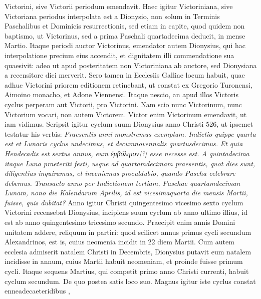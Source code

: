 Victorini, sive Victorii periodum emendavit.
Haec igitur Victoriniana,
sive Victoriana periodus interpolata est a Dionysio, non solum
in Terminis Paschalibus et Dominicis resurrectionis, sed etiam
in capite, quod quidem non baptismo, ut Victorinus, sed a prima
Paschali quartadecima deducit, in mense Martio.
Itaque periodi
auctor Victorinus, emendator autem Dionysius, qui hac interpolatione
precium eius accendit, et dignitatem illi commendatione
sua quaesivit: adeo ut apud posteritatem non Victoriniana ab auctore,
sed Dionysiana a recensitore dici merverit.
Sero tamen in Ecclesiis
Galliae locum habuit, quae adhuc Victorini priorem editionem
retinebant, ut constat ex Gregorio Turonensi, Aimoino monacho,
et Adone Viennensi.
Itaque nescio, an apud illos Victoris
cyclus perperam aut Victorii, pro Victorini.
Nam scio nunc Victorinum,
nunc Victorium vocari, non autem Victorem.
Victor
enim Victorinum emendavit, ut iam vidimus.
Scripsit igitur cyclum
suum Dionysius anno Christi 526, ut ipsemet testatur his verbis:
\textit{Praesentis anni monstremus exemplum.}
\textit{Indictio quippe quarta est
et Lunaris cyclus undecimus, et decumnovennalis quartusdecimus.}
\textit{Et quia Hendecadis est sextus annus,
 eum \textgreek{ἐμβόλιμον[?]} esse necesse est.}
\textit{A quintadecima itaque Luna praeteriti festi,
 usque ad quartamdecimam
praesentis, quot dies sunt, diligentius inquiramus, et inveniemus proculdubio,
quando Pascha celebrare debemus.}
\textit{Transacto anno per Indictionem
tertiam, Paschae quartamdeciman Lunam, nono die Kalendarum
Aprilis, id est vicesimaquarta die mensis Martii, fuisse,
quis dubitat?}
Anno igitur Christi quingentesimo vicesimo sexto
cyclum Victorini recensebat Dionysius, incipiens suum cyclum ab
anno ultimo illius, id est ab anno quingentesimo tricesimo secundo.
Praecipit enim annis Domini unitatem addere,
 reliquum in  partiri:
quod scilicet annus primus cycli secundum Alexandrinos, est
is, cuius neomenia incidit in 22 diem Martii.
Cum autem ecclesia
admiserit natalem Christi in  Decembris, Dionysius putavit
eum natalem incidisse in annum, cuius  Martii habuit
neomeniam, et proinde fuisse primum cycli.
Itaque sequens Martius,
qui competit primo anno Christi currenti, habuit cyclum secundum.
%
De quo postea satis loco suo.
Magnus igitur
iste cyclus constat enneadecaeteridibus ,
